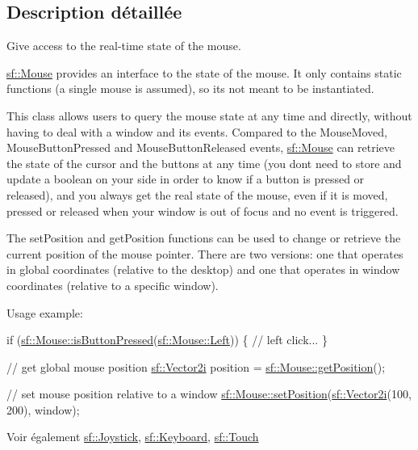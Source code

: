 \subsection{Description détaillée}
Give access to the real-\/time state of the mouse. 

\hyperlink{classsf_1_1Mouse}{sf\+::\+Mouse} provides an interface to the state of the mouse. It only contains static functions (a single mouse is assumed), so it\textquotesingle{}s not meant to be instantiated.

This class allows users to query the mouse state at any time and directly, without having to deal with a window and its events. Compared to the Mouse\+Moved, Mouse\+Button\+Pressed and Mouse\+Button\+Released events, \hyperlink{classsf_1_1Mouse}{sf\+::\+Mouse} can retrieve the state of the cursor and the buttons at any time (you don\textquotesingle{}t need to store and update a boolean on your side in order to know if a button is pressed or released), and you always get the real state of the mouse, even if it is moved, pressed or released when your window is out of focus and no event is triggered.

The set\+Position and get\+Position functions can be used to change or retrieve the current position of the mouse pointer. There are two versions\+: one that operates in global coordinates (relative to the desktop) and one that operates in window coordinates (relative to a specific window).

Usage example\+: 
\begin{DoxyCode}
\textcolor{keywordflow}{if} (\hyperlink{classsf_1_1Mouse_ab647159eb88e369a0332a9c5a7ba6687}{sf::Mouse::isButtonPressed}(\hyperlink{classsf_1_1Mouse_a4fb128be433f9aafe66bc0c605daaa90a8bb4856e1ec7f6b6a8605effdfc0eee8}{sf::Mouse::Left}))
\{
    \textcolor{comment}{// left click...}
\}

\textcolor{comment}{// get global mouse position}
\hyperlink{classsf_1_1Vector2}{sf::Vector2i} position = \hyperlink{classsf_1_1Mouse_ac368680f797b7f6e4f50b5b7928c1387}{sf::Mouse::getPosition}();

\textcolor{comment}{// set mouse position relative to a window}
\hyperlink{classsf_1_1Mouse_a1222e16c583be9e3d176d86e0b7817d7}{sf::Mouse::setPosition}(\hyperlink{classsf_1_1Vector2}{sf::Vector2i}(100, 200), window);
\end{DoxyCode}


\begin{DoxySeeAlso}{Voir également}
\hyperlink{classsf_1_1Joystick}{sf\+::\+Joystick}, \hyperlink{classsf_1_1Keyboard}{sf\+::\+Keyboard}, \hyperlink{classsf_1_1Touch}{sf\+::\+Touch} 
\end{DoxySeeAlso}



